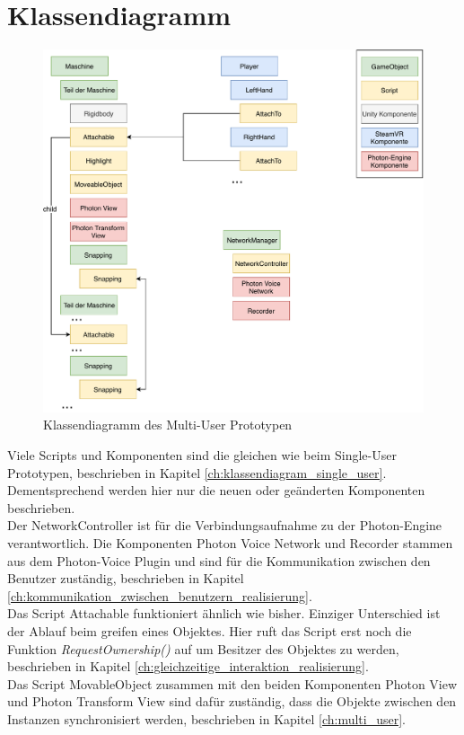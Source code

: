 \section{Klassendiagramm}

\begin{figure}[h!]
	\centering
	\includegraphics[keepaspectratio,width=0.75\linewidth]{img/Klassendiagramm_T2.pdf}
	\caption{Klassendiagramm des Multi-User Prototypen}
	\label{fig:klassendiagramm_multi_user}
\end{figure}

Viele Scripts und Komponenten sind die gleichen wie beim Single-User Prototypen, beschrieben in Kapitel \ref{ch:klassendiagram_single_user}. Dementsprechend werden hier nur die neuen oder geänderten Komponenten beschrieben. \\

\noindent Der \grqq NetworkController\grqq{} ist für die Verbindungsaufnahme zu der Photon-Engine verantwortlich. Die Komponenten \grqq Photon Voice Network\grqq{} und \grqq Recorder\grqq{} stammen aus dem Photon-Voice Plugin und sind für die Kommunikation zwischen den Benutzer zuständig, beschrieben in Kapitel \ref{ch:kommunikation_zwischen_benutzern_realisierung}. \\
Das Script \grqq Attachable\grqq{} funktioniert ähnlich wie bisher. Einziger Unterschied ist der Ablauf beim greifen eines Objektes. Hier ruft das Script erst noch die Funktion \textit{RequestOwnership()} auf um Besitzer des Objektes zu werden, beschrieben in Kapitel \ref{ch:gleichzeitige_interaktion_realisierung}. \\
Das Script \grqq MovableObject\grqq{} zusammen mit den beiden Komponenten \grqq Photon View\grqq{} und \grqq Photon Transform View\grqq{} sind dafür zuständig, dass die Objekte zwischen den Instanzen synchronisiert werden, beschrieben in Kapitel \ref{ch:multi_user}.